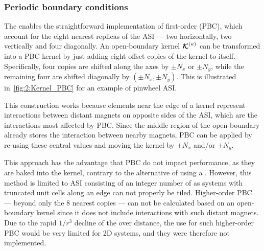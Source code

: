 \subsubsection{Periodic boundary conditions}\label{sec:2:Kernels:PBC}
The  enables the straightforward implementation of first-order  (PBC), which account for the eight nearest replicas of the ASI --- two horizontally, two vertically and four diagonally.
An open-boundary kernel $\boldsymbol{\mathbf{\mathcal{K}}}^{(\kappa)}$ can be transformed into a PBC kernel by just adding eight offset copies of the kernel to itself.
Specifically, four copies are shifted along the axes by $\pm N_x$ or $\pm N_y$, while the remaining four are shifted diagonally by $(\pm N_x, \pm N_y)$.
This is illustrated in~\cref{fig:2:Kernel_PBC} for an example of pinwheel ASI. \par
This construction works because elements near the edge of a kernel represent interactions between distant magnets on opposite sides of the ASI, which are the interactions most affected by PBC.
Since the middle region of the open-boundary  already stores the interaction between nearby magnets, PBC can be applied by re-using these central values and moving the kernel by $\pm N_x$ and/or $\pm N_y$. \\\par

This approach has the advantage that PBC do not impact performance, as they are baked into the kernel, contrary to the alternative of using a .
However, this method is limited to ASI consisting of an integer number of  as systems with truncated unit cells along an edge can not properly be tiled.
Higher-order PBC --- beyond only the 8 nearest copies --- can not be calculated based on an open-boundary kernel since it does not include interactions with such distant magnets.
Due to the rapid $1/r^3$ decline of the  over distance, the use for such higher-order PBC would be very limited for 2D systems, and they were therefore not implemented.

